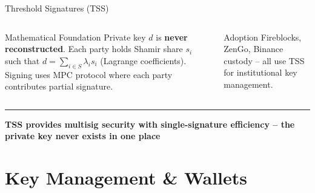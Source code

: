 \documentclass[8pt,aspectratio=169]{beamer}
\newcommand{\bottomnote}[1]{\vfill\vspace{-2mm}\textcolor{mllavender2}{\rule{\textwidth}{0.4pt}}\vspace{1mm}\footnotesize\textbf{#1}}
\begin{document}
\begin{frame}{Threshold Signatures (TSS)}
\begin{columns}
\begin{block}{Mathematical Foundation}
\small Private key $d$ is \textbf{never reconstructed}. Each party holds Shamir share $s_i$ such that $d = \sum_{i \in S} \lambda_i s_i$ (Lagrange coefficients). Signing uses MPC protocol where each party contributes partial signature.
\end{block}
\vspace{2mm}
\begin{alertblock}{Adoption}\small
Fireblocks, ZenGo, Binance custody -- all use TSS for institutional key management.
\end{alertblock}
\end{columns}
\bottomnote{TSS provides multisig security with single-signature efficiency -- the private key never exists in one place}
\end{frame}

\section{Key Management \& Wallets}
\end{document}
